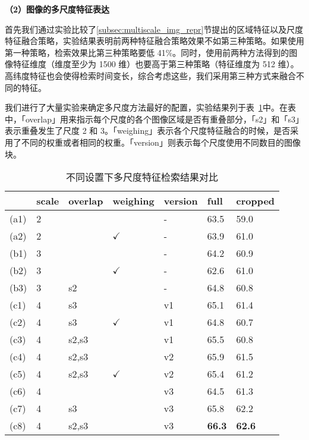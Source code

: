 \noindent\textbf{（2）图像的多尺度特征表达}

首先我们通过实验比较了\ref{subsec:multiscale_img_repr}节提出的区域特征以及尺度特征融合策略，实验结果表明前两种特征融合策略效果不如第三种策略。如果使用第一种策略，检索效果比第三种策略要低 41\%。同时，使用前两种方法得到的图像特征维度（维度至少为 1500 维）也要高于第三种策略（特征维度为 512 维）。高纬度特征也会使得检索时间变长，综合考虑这些，我们采用第三种方式来融合不同的特征。

我们进行了大量实验来确定多尺度方法最好的配置，实验结果列于表~\ref{table:multiscale_exp_result}中。在表中，「overlap」用来指示每个尺度的各个图像区域是否有重叠部分，「s2」和「s3」表示重叠发生了尺度 2 和 3。「weighing」表示各个尺度特征融合的时候，是否采用了不同的权重或者相同的权重。「version」则表示每个尺度使用不同数目的图像块。
\begin{table}[!t]
	\centering
	\caption{不同设置下多尺度特征检索结果对比}
	\label{table:multiscale_exp_result}
	\begin{tabular}{@{}lllllll@{}}
		\toprule
		&   scale &  overlap   &  weighing  & version &     full    &    cropped    \\
		\midrule
		(a1) &   2   & \texttimes & \texttimes &    -    &     63.5      &     59.0      \\
		(a2) &   2   & \texttimes & $\checkmark$ &    -    &     63.9      &     61.0      \\
		\midrule
		(b1) &   3   & \texttimes & \texttimes &    -    &     64.2      &     60.9      \\
		(b2) &   3   & \texttimes & $\checkmark$ &    -    &     62.6      &     61.0      \\
		(b3) &   3   &     s2     & \texttimes &    -    &     64.8      &     60.8      \\
		\midrule
		(c1) &   4   &     s3     & \texttimes &   v1    &     65.1      &     61.4      \\
		(c2) &   4   &     s3     & $\checkmark$ &   v1    &     64.8      &     60.7      \\
		(c3) &   4   &   s2,s3    & \texttimes &   v1    &     65.5      &     60.8      \\
		(c4) &   4   &   s2,s3    & \texttimes&   v2    &     65.9      &     61.5      \\
		(c5) &   4   &   s2,s3    & $\checkmark$ &   v2    &     65.4      &     61.2      \\
		(c6) &   4   & \texttimes & \texttimes &   v3    &     64.5      &     61.3      \\
		(c7) &   4   &     s3     & \texttimes&   v3    &     65.8      &     62.2      \\
		(c8) &   4   &   s2,s3    & \texttimes&   v3    & \textbf{66.3} & \textbf{62.6} \\
		\bottomrule
	\end{tabular}
\end{table}

